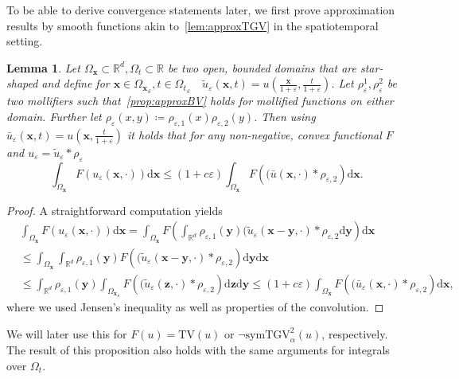 \documentclass{article}
\newcommand{\dx}{\mathrm{d}}
\newcommand{\R}{\mathbb{R}}
\newcommand{\NSymTGV}{\neg \mathrm{symTGV}}
\newcommand{\TV}{\mathrm{TV}}
\newcommand{\OmegaSpace}{\Omega_\mathbf{x}}
\newcommand{\OmegaTime}{\Omega_t}
\newtheorem{lemma}[theorem]{Lemma}
\begin{document}
	To be able to derive convergence statements later, we first prove approximation results by smooth functions akin to~\cref{lem:approxTGV} in the spatiotemporal setting.
	\begin{lemma}
		\label{lem:STmollifier}
		Let $\OmegaSpace \subset \R^d, \OmegaTime\subset \R$ be two open, bounded domains that are star-shaped and define for $\mathbf{x} \in {\OmegaSpace}_{\varepsilon}, t \in {\OmegaTime}_{\varepsilon}\quad\tilde{u}_\varepsilon(\mathbf{x}, t) = u(\frac{\mathbf{x}}{1+\varepsilon},\frac{t}{1 + \varepsilon})$.
		Let $\rho_\varepsilon^1, \rho_\varepsilon^2$ be two mollifiers such that~\cref{prop:approxBV} holds for mollified functions on either domain.
		Further let $\rho_\varepsilon(x, y) \coloneqq \rho_{\varepsilon,1}(x)\rho_{\varepsilon,2}(y)$.
		Then  using $\bar{u}_\varepsilon(\mathbf{x}, t) = u(\mathbf{x},\frac{t}{1 + \varepsilon})$ it holds that for any non-negative, convex functional $F$ and $u_\varepsilon = \tilde{u}_\varepsilon*\rho_\varepsilon$
		\begin{equation*}
			\int_{\OmegaSpace}F(u_\varepsilon(\mathbf{x}, \cdot)) \dx \mathbf{x} \leq (1 + c\varepsilon)\int_{\OmegaSpace}F\left( (\bar{u}(\mathbf{x}, \cdot) * \rho_{\varepsilon,2}\right) \dx \mathbf{x}.
		\end{equation*}
	\end{lemma}
	\begin{proof}
		A straightforward computation yields
		\begin{align*}
			&\int_{\OmegaSpace}F(u_\varepsilon(\mathbf{x}, \cdot)) \dx \mathbf{x}
			= \int_{\OmegaSpace}F\left(\int_{\R^d}\rho_{\varepsilon,1}(\mathbf{y}) (\tilde{u}_\varepsilon(\mathbf{x} - \mathbf{y}, \cdot) * \rho_{\varepsilon,2} \dx \mathbf{y}\right) \dx \mathbf{x}\\
			&\leq \int_{\OmegaSpace}\int_{\R^d}\rho_{\varepsilon,1}(\mathbf{y})F\left( (\tilde{u}_\varepsilon(\mathbf{x} - \mathbf{y}, \cdot) * \rho_{\varepsilon,2}\right) \dx \mathbf{y} \dx \mathbf{x}
			\\
			&\leq \int_{\R^d}\rho_{\varepsilon,1}(\mathbf{y})\int_{{\OmegaSpace}_{\varepsilon}}F\left( (\tilde{u}_\varepsilon(\mathbf{z}, \cdot) * \rho_{\varepsilon,2}\right) \dx \mathbf{z} \dx \mathbf{y}
			\leq (1 + c\varepsilon)\int_{\OmegaSpace} F\left( (\bar{u}_\varepsilon(\mathbf{x}, \cdot) * \rho_{\varepsilon,2}\right) \dx \mathbf{x},
		\end{align*}
		where we used Jensen's inequality as well as properties of the convolution.
	\end{proof}
	We will later use this for $F(u) = \TV(u)$ or $\NSymTGV_\alpha^2(u)$, respectively.
	The result of this proposition also holds with the same arguments for integrals over $\OmegaTime$.
\end{document}
